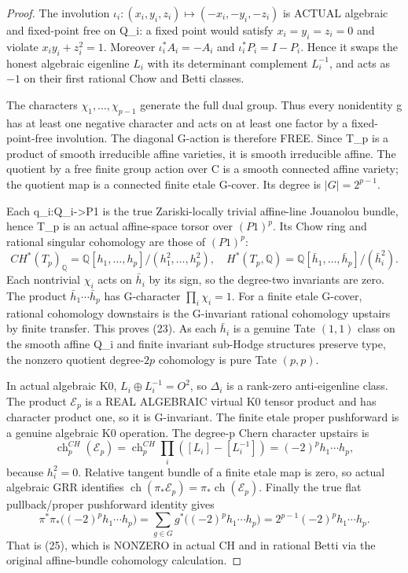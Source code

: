\documentclass[11pt]{article}
\begin{document}
\begin{proof}
The involution
$\iota_i:(x_i,y_i,z_i)\mapsto
(-x_i,-y_i,-z_i)$
is ACTUAL algebraic and fixed-point
free on Q_i: a fixed point would
satisfy $x_i=y_i=z_i=0$ and violate
$x_iy_i+z_i^2=1$. Moreover
$\iota_i^*A_i=-A_i$ and
$\iota_i^*P_i=I-P_i$.
Hence it swaps the honest
algebraic eigenline $L_i$ with
its determinant complement
$L_i^{-1}$, and acts as
$-1$ on their first rational
Chow and Betti classes.

The characters $\chi_1,\ldots,
\chi_{p-1}$ generate the full
dual group. Thus every
nonidentity g has at least
one negative character and
acts on at least one factor
by a fixed-point-free
involution. The diagonal
G-action is therefore FREE.
Since T_p is a product of
smooth irreducible affine
varieties, it is smooth
irreducible affine.
The quotient by a free finite
group action over C is a
smooth connected affine
variety; the quotient map is
a connected finite etale
G-cover. Its degree is
$|G|=2^{p-1}$.

Each q_i:Q_i->P1 is the true
Zariski-locally trivial
affine-line Jouanolou bundle,
hence T_p is an actual
affine-space torsor over
$(P1)^p$. Its Chow ring and
rational singular cohomology
are those of $(P1)^p$:
\[
 CH^*(T_p)_{\mathbb Q}
  =\mathbb Q[h_1,\ldots,h_p]/
                 (h_1^2,\ldots,h_p^2),
\quad
 H^*(T_p,\mathbb Q)
  =\mathbb Q[\bar h_1,\ldots,\bar h_p]/
                 (\bar h_i^2).
\]
Each nontrivial $\chi_i$
acts on $\bar h_i$ by its sign,
so the degree-two invariants
are zero. The product
$\bar h_1\cdots\bar h_p$
has G-character
$\prod_i\chi_i=1$.
For a finite etale G-cover,
rational cohomology downstairs
is the G-invariant rational
cohomology upstairs by finite
transfer. This proves (23).
As each $\bar h_i$ is a
genuine Tate $(1,1)$ class
on the smooth affine Q_i
and finite invariant
sub-Hodge structures
preserve type, the nonzero
quotient degree-$2p$
cohomology is pure Tate $(p,p)$.

In actual algebraic K0,
$L_i\oplus L_i^{-1}=O^2$,
so $\Delta_i$ is a rank-zero
anti-eigenline class. The
product $\mathcal E_p$
is a REAL ALGEBRAIC virtual
K0 tensor product and has
character product one,
so it is G-invariant.
The finite etale proper
pushforward is a genuine
algebraic K0 operation.
The degree-p Chern character
upstairs is
\[
 \operatorname{ch}^{CH}_p
     (\mathcal E_p)
   =\operatorname{ch}^{CH}_p
     \prod_i
       ([L_i]-[L_i^{-1}])
   =(-2)^p h_1\cdots h_p ,
\]
because $h_i^2=0$.
Relative tangent bundle of a
finite etale map is zero,
so actual algebraic GRR
identifies
$\operatorname{ch}(\pi_*\mathcal E_p)
=\pi_*\operatorname{ch}(\mathcal E_p)$.
Finally the true flat
pullback/proper pushforward
identity gives
\[
 \pi^*\pi_*
    \bigl((-2)^ph_1\cdots h_p\bigr)
 =\sum_{g\in G}
    g^*\bigl((-2)^ph_1\cdots h_p\bigr)
 =2^{p-1}(-2)^p h_1\cdots h_p .
\]
That is (25), which is NONZERO
in actual CH and in rational
Betti via the original
affine-bundle cohomology
calculation.


\end{proof}
\end{document}
